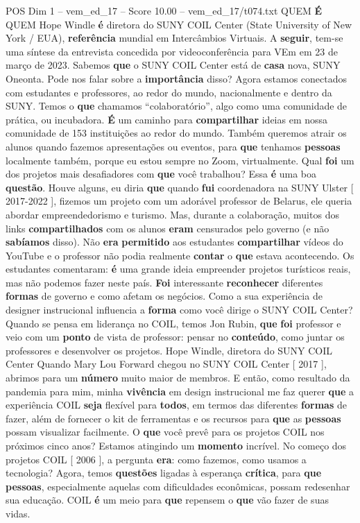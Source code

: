 \begin{textsample}{POS Dim 1 – vem\_ed\_17 – Score 10.00 – vem\_ed\_17/t074.txt}  \label{ex:f1_pos_133}
QUEM \textbf{É} QUEM Hope Windle \textbf{é} diretora do SUNY COIL Center (State University of New York / EUA), \textbf{referência} mundial em Intercâmbios Virtuais.
A \textbf{seguir}, tem-se uma síntese da entrevista concedida por videoconferência para VEm em 23 de março de 2023.
Sabemos \textbf{que} o SUNY COIL Center está de \textbf{casa} nova, SUNY Oneonta.
Pode nos falar sobre a \textbf{importância} disso?
Agora estamos conectados com estudantes e professores, ao redor do mundo, nacionalmente e dentro da SUNY.
Temos o \textbf{que} chamamos “colaboratório”, algo como uma comunidade de prática, ou incubadora. \textbf{É} um caminho para \textbf{compartilhar} ideias em nossa comunidade de 153 instituições ao redor do mundo.
Também queremos atrair os alunos quando fazemos apresentações ou eventos, para \textbf{que} tenhamos \textbf{pessoas} localmente também, porque eu estou sempre no Zoom, virtualmente.
Qual \textbf{foi} um dos projetos mais desafiadores com \textbf{que} você trabalhou?
Essa \textbf{é} uma boa \textbf{questão}.
Houve alguns, eu diria \textbf{que} quando \textbf{fui} coordenadora na SUNY Ulster [ 2017-2022 ], fizemos um projeto com um adorável professor de Belarus, ele queria abordar empreendedorismo e turismo.
Mas, durante a colaboração, muitos dos links \textbf{compartilhados} com os alunos \textbf{eram} censurados pelo governo (e não \textbf{sabíamos} disso).
Não \textbf{era} \textbf{permitido} aos estudantes \textbf{compartilhar} vídeos do YouTube e o professor não podia realmente \textbf{contar} o \textbf{que} estava acontecendo.
Os estudantes comentaram: \textbf{é} uma grande ideia empreender projetos turísticos reais, mas não podemos fazer neste país. \textbf{Foi} interessante \textbf{reconhecer} diferentes \textbf{formas} de governo e como afetam os negócios.
Como a sua experiência de designer instrucional influencia a \textbf{forma} como você dirige o SUNY COIL Center?
Quando se pensa em liderança no COIL, temos Jon Rubin, \textbf{que} \textbf{foi} professor e veio com um \textbf{ponto} de vista de professor: pensar no \textbf{conteúdo}, como juntar os professores e desenvolver os projetos.
Hope Windle, diretora do SUNY COIL Center Quando Mary Lou Forward chegou no SUNY COIL Center [ 2017 ], abrimos para um \textbf{número} muito maior de membros.
E então, como resultado da pandemia para mim, minha \textbf{vivência} em design instrucional me faz querer \textbf{que} a experiência COIL \textbf{seja} flexível para \textbf{todos}, em termos das diferentes \textbf{formas} de fazer, além de fornecer o kit de ferramentas e os recursos para \textbf{que} as \textbf{pessoas} possam visualizar facilmente.
O \textbf{que} você prevê para os projetos COIL nos próximos cinco anos?
Estamos atingindo um \textbf{momento} incrível.
No começo dos projetos COIL [ 2006 ], a pergunta \textbf{era}: como fazemos, como usamos a tecnologia?
Agora, temos \textbf{questões} ligadas à esperança \textbf{crítica}, para \textbf{que} \textbf{pessoas}, especialmente aquelas com dificuldades econômicas, possam redesenhar sua educação.
COIL \textbf{é} um meio para \textbf{que} repensem o \textbf{que} vão fazer de suas vidas.


\end{textsample}
